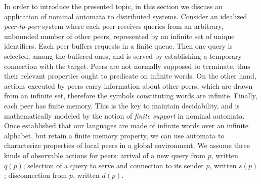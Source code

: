 
In order to introduce the presented topic, in this section we discuss an application of nominal automata to distributed systems. Consider an idealized \emph{peer-to-peer} system where each peer receives queries from an arbitrary, unbounded number of other peers, represented by an infinite set of unique identifiers. Each peer buffers requests in a finite queue. Then one query is selected, among the buffered ones, and is served by establishing a temporary connection with the target. Peers are not normally supposed to terminate, thus their relevant properties ought to predicate on infinite words. On the other hand, actions executed by peers carry information about other peers, which are drawn from an infinite set, therefore the symbols constituting words are infinite. Finally, each peer has finite memory. This is the key to maintain decidability, and is mathematically modeled by the notion of \emph{finite support} in nominal automata. Once established that our languages are made of infinite words over an infinite alphabet, but retain a finite memory property, we can use automata to characterize properties of local peers in a global environment. 
We assume three kinds of observable actions for peers: 
	arrival of a new query from $p$, written $q(p)$; 
	selection of a query to serve and connection to its sender $p$, written $s(p)$; 
	disconnection from $p$, written $d(p)$.
%


